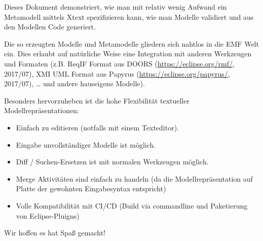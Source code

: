 \documentclass[a4]{article}
\providecommand{\tightlist}{%
  \setlength{\itemsep}{0pt}\setlength{\parskip}{0pt}}
\begin{document}
Dieses Dokument demonstriert, wie man mit relativ wenig Aufwand ein
Metamodell mittels Xtext spezifizieren kann, wie man Modelle validiert
und aus den Modellen Code generiert.

Die so erzeugten Modelle und Metamodelle gliedern sich nahtlos in die
EMF Welt ein. Dies erlaubt auf natürliche Weise eine Integration mit
anderen Werkzeugen und Formaten (z.B. ReqIF Format aus DOORS
(\url{https://eclipse.org/rmf/}, 2017/07), XMI UML Format aus Papyrus
(\url{https://eclipse.org/papyrus/}, 2017/07), \ldots{} und andere
hauseigene Modelle).

Besonders hervorzuheben ist die hohe Flexibilität textueller
Modellrepräsentationen:

\begin{itemize}
\tightlist
\item
  Einfach zu editieren (notfalls mit einem Texteditor).
\item
  Eingabe unvollständiger Modelle ist möglich.
\item
  Diff / Suchen-Ersetzen ist mit normalen Werkzeugen möglich.
\item
  Merge Aktivitäten sind einfach zu handeln (da die Modellrepräsentation
  auf Platte der gewohnten Eingabesyntax entspricht)
\item
  Volle Kompatibilität mit CI/CD (Build via commandline und Paketierung
  von Eclipse-Pluigns)
\end{itemize}

Wir hoffen es hat Spaß gemacht!
\end{document}
